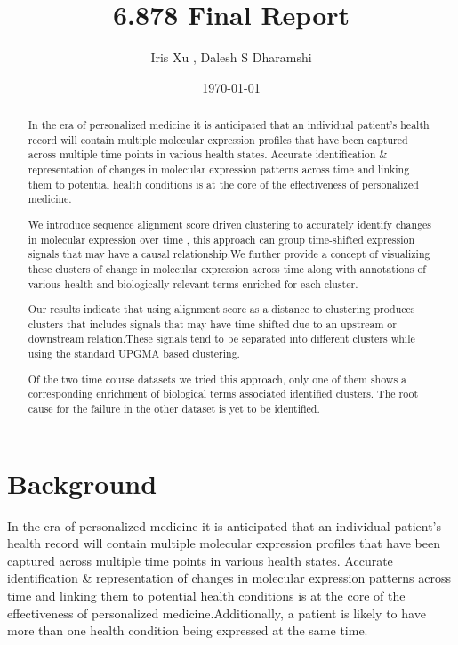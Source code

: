 \documentclass[aps,prd,final,onecolumn,a4paper,10pt]{revtex4}
\begin{document}
\title{6.878 Final Report}
\author{Iris Xu , Dalesh S Dharamshi }	
\date{\today} 

\begin{abstract}
\noindent
  In the era of personalized medicine it is anticipated that an individual patient's health record will contain multiple molecular expression profiles that have been captured across multiple time points in various health states. Accurate identification \& representation of changes in molecular expression patterns across time and linking them to potential health conditions is at the core of the effectiveness of personalized medicine. 
  
  We introduce sequence alignment score driven clustering to accurately identify changes in molecular expression over time , this approach can group time-shifted expression signals that may have a causal relationship.We further provide a concept of visualizing these clusters of change in molecular expression across time along with annotations of various health and biologically relevant terms enriched for each cluster.
  
  Our results indicate that using alignment score as a distance to clustering produces clusters that includes signals that may have time shifted due to an upstream or downstream relation.These signals tend to be separated into different clusters while using the standard UPGMA based clustering. 
  
  Of the two time course datasets we tried this approach, only one of them shows a corresponding enrichment of biological terms associated identified clusters. The root cause for the failure in the other dataset is yet to be identified.
  
\end{abstract}

\maketitle

\pagestyle{myheadings}
\thispagestyle{empty}


\section{Background}
	
	In the era of personalized medicine it is anticipated that an individual patient's health record will contain multiple molecular expression profiles that have been captured across multiple time points in various health states. Accurate identification \& representation of changes in molecular expression patterns across time and linking them to potential health conditions is at the core of the effectiveness of personalized medicine.Additionally, a patient is likely to have more than one health condition being expressed at the same time.
\end{document}
